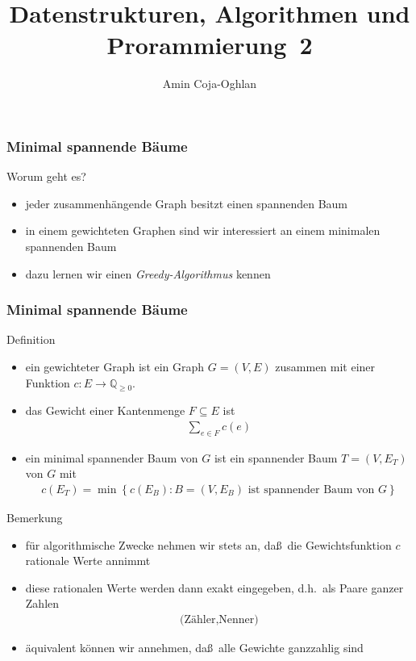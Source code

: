 \documentclass[aspectratio=1610, 11pt]{beamer}
\title{Datenstrukturen, Algorithmen und Prorammierung~2}
\author[A.~Coja-Oghlan]{Amin Coja-Oghlan}
\institute[DAP2]{Lehrstuhl Informatik 2\\Fakult\"at f\"ur Informatik}
\newcommand\QQpos{\mathbb Q_{\geq0}}
\newcommand\cbc[1]{\left\{{#1}\right\}}
\newcommand{\mytitle}{Minimal spannende B\"aume}
\begin{document}
\frame[plain]{\titlepage}

\begin{frame}\frametitle{\mytitle}
	\begin{exampleblock}{Worum geht es?}
		\begin{itemize}
			\item jeder zusammenh\"angende Graph besitzt einen spannenden Baum
			\item in einem gewichteten Graphen sind wir interessiert an einem \alert{minimalen} spannenden Baum
			\item dazu lernen wir einen \emph{Greedy-Algorithmus} kennen
		\end{itemize}
	\end{exampleblock}
\end{frame}

\begin{frame}\frametitle{\mytitle}
	\begin{overprint}
\begin{block}{Definition}
		\begin{itemize}
			\item ein \alert{gewichteter Graph} ist ein Graph $G=(V,E)$ zusammen mit einer Funktion $c:E\to \QQpos$.
			\item das \alert{Gewicht} einer Kantenmenge $F\subseteq E$ ist
				\begin{align*}
					\sum_{e\in F}c(e)
				\end{align*}
			\item ein \alert{minimal spannender Baum} von $G$ ist ein spannender Baum $T=(V,E_T)$ von $G$ mit
				\begin{align*}
					c(E_T)=\min\cbc{c(E_B):B=(V,E_B)\mbox{ ist spannender Baum von }G}
				\end{align*}
		\end{itemize}
	\end{block}
\begin{exampleblock}{Bemerkung}
		\begin{itemize}
			\item f\"ur algorithmische Zwecke nehmen wir stets an, da\ss\ die Gewichtsfunktion $c$ rationale Werte annimmt
			\item diese rationalen Werte werden dann exakt eingegeben, d.h.\ als Paare ganzer Zahlen
				\begin{align*}
					\mbox{(Z\"ahler,Nenner)}
				\end{align*}
			\item \"aquivalent k\"onnen wir annehmen, da\ss\ alle Gewichte ganzzahlig sind
		\end{itemize}
	\end{exampleblock}
	\end{overprint}
\end{frame}
\end{document}
